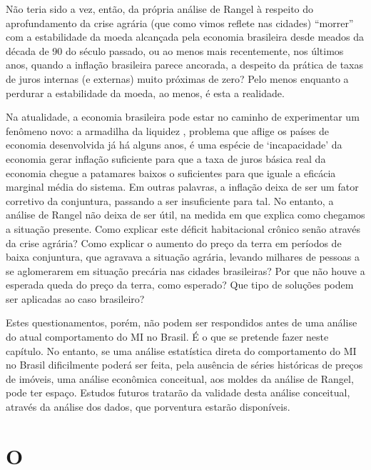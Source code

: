 \documentclass[
	12pt,				%
	oneside,			%
	a4paper,			%
	chapter=TITLE,		%
	section=TITLE,		%
	english,			%
	brazil				%
	]{abntex2}
\begin{document}
\begin{refsection}
Não teria sido a vez, então, da própria análise de Rangel à respeito do
aprofundamento da crise agrária (que como vimos reflete nas cidades) ``morrer''
com a estabilidade da moeda alcançada pela economia brasileira desde meados da
década de 90 do século passado, ou ao menos mais recentemente, nos últimos anos,
quando a inflação brasileira parece ancorada, a despeito da prática de taxas de
juros internas (e externas) muito próximas de zero? Pelo menos enquanto a
perdurar a estabilidade da moeda, ao menos, é esta a realidade.

Na atualidade, a economia brasileira pode estar no caminho de experimentar um
fenômeno novo: a armadilha da liquidez \autocite[ver][]{krugman-emergentes}, problema que
aflige os países de economia desenvolvida já há alguns anos, é uma espécie de
`incapacidade' da economia gerar inflação suficiente para que a taxa de juros
básica real da economia chegue a patamares baixos o suficientes para que iguale
a eficácia marginal média do sistema. Em outras palavras, a inflação deixa de
ser um fator corretivo da conjuntura, passando a ser insuficiente para tal. No
entanto, a análise de Rangel não deixa de ser útil, na medida em que explica
como chegamos a situação presente. Como explicar este déficit habitacional
crônico senão através da crise agrária? Como explicar o aumento do preço da
terra em períodos de baixa conjuntura, que agravava a situação agrária, levando
milhares de pessoas a se aglomerarem em situação precária nas cidades
brasileiras? Por que não houve a esperada queda do preço da terra, como
esperado? Que tipo de soluções podem ser aplicadas ao caso brasileiro?

Estes questionamentos, porém, não podem ser respondidos antes de uma análise do
atual comportamento do \gls{MI} no Brasil. É o que se pretende fazer neste
capítulo. No entanto, se uma análise estatística direta do comportamento do
\gls{MI} no Brasil dificilmente poderá ser feita, pela ausência de séries
históricas de preços de imóveis, uma análise econômica conceitual, aos moldes da
análise de Rangel, pode ter espaço. Estudos futuros tratarão da validade desta
análise conceitual, através da análise dos dados, que porventura estarão
disponíveis.

\hypertarget{o}{%
\section{\texorpdfstring{O }{O }}\label{o}}


\end{refsection}
\end{document}
